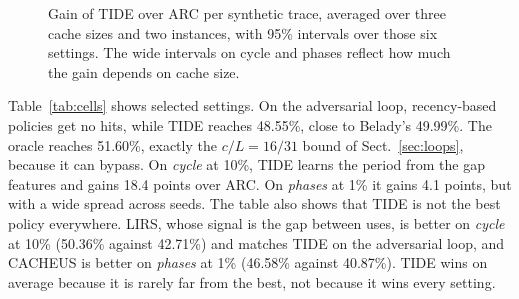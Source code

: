 \documentclass{llncs}
\begin{document}
\begin{figure}[htbp]
\centering
{}
\caption{Gain of TIDE over ARC per synthetic trace, averaged over three cache sizes and two instances, with 95\% intervals over those six settings. The wide intervals on cycle and phases reflect how much the gain depends on cache size.}
\label{fig:gain}
\end{figure}

Table~\ref{tab:cells} shows selected settings. On the adversarial loop, recency-based policies get no hits, while TIDE reaches 48.55\%, close to Belady's 49.99\%. The oracle reaches 51.60\%, exactly the $c/L = 16/31$ bound of Sect.~\ref{sec:loops}, because it can bypass. On \emph{cycle} at 10\%, TIDE learns the period from the gap features and gains 18.4 points over ARC. On \emph{phases} at 1\% it gains 4.1 points, but with a wide spread across seeds. The table also shows that TIDE is not the best policy everywhere. LIRS, whose signal is the gap between uses, is better on \emph{cycle} at 10\% (50.36\% against 42.71\%) and matches TIDE on the adversarial loop, and CACHEUS is better on \emph{phases} at 1\% (46.58\% against 40.87\%). TIDE wins on average because it is rarely far from the best, not because it wins every setting.
\end{document}
